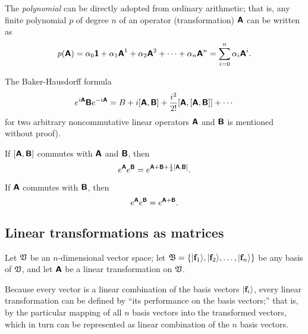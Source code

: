 The {\em polynomial}
can be directly adopted from ordinary arithmetic; that is,
any finite polynomial $p$ of degree $n$
of an operator (transformation) $\textsf{\textbf{A}}$ can be written as
\begin{equation}
p(\textsf{\textbf{A}})= \alpha_0   \textsf{\textbf{1}}
+ \alpha_1   \textsf{\textbf{A}}^1
+ \alpha_2   \textsf{\textbf{A}}^2+
\cdots
+
\alpha_n   \textsf{\textbf{A}}^n
=\sum_{i=0}^n \alpha_i \textsf{\textbf{A}}^i
.
\end{equation}

The Baker-Hausdorff formula
 \begin{equation}
 e^{i\textsf{\textbf{A}}}\textsf{\textbf{B}}e^{-i\textsf{\textbf{A}}}=
B+i[\textsf{\textbf{A}},\textsf{\textbf{B}}]+
{i^2\over 2!}[\textsf{\textbf{A}},[\textsf{\textbf{A}},\textsf{\textbf{B}}]]+\cdots
 \end{equation}
for two arbitrary noncommutative linear operators $\textsf{\textbf{A}}$ and
$\textsf{\textbf{B}}$ is mentioned without proof\cite[-10mm]{messiah-61}).

If $[\textsf{\textbf{A}},\textsf{\textbf{B}}]$ commutes with $\textsf{\textbf{A}}$ and
$\textsf{\textbf{B}}$, then
 \begin{equation}
 e^\textsf{\textbf{A}}e^\textsf{\textbf{B}}=
e^{\textsf{\textbf{A}}+\textsf{\textbf{B}}+{1\over 2}\left[\textsf{\textbf{A}},\textsf{\textbf{B}}\right]}.
 \end{equation}

If  $\textsf{\textbf{A}}$ commutes with $\textsf{\textbf{B}}$, then
 \begin{equation}
 e^\textsf{\textbf{A}}e^\textsf{\textbf{B}}=
e^{\textsf{\textbf{A}}+\textsf{\textbf{B}}}.
 \end{equation}

\subsection{Linear transformations as matrices}




Let ${\frak V}$ be an $n$-dimensional vector space;
let
${\frak B}=\{\vert {\bf f}_1 \rangle ,\vert {\bf f}_2 \rangle,\ldots ,\vert {\bf f}_n \rangle\}$ be any basis of ${\frak V}$,
and let  $\textsf{\textbf{A}}$ be a linear transformation on ${\frak V}$.

Because every vector is a linear combination of the basis vectors
$\vert {\bf f}_i \rangle$,
every linear transformation can be defined by
``its performance on the basis vectors;'' that is,
by the particular mapping of
all $n$ basis vectors into the transformed vectors, which in turn can be represented as linear combination of the $n$ basis vectors.

